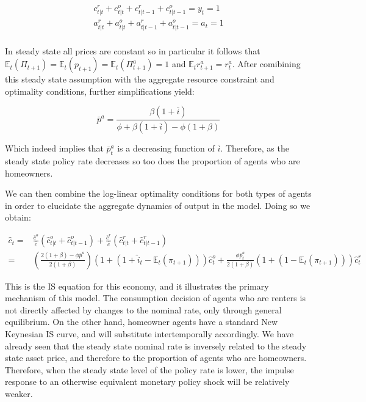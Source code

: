 \documentclass{article}
\begin{document}
\begin{align}
    c^r_{t|t} + c^o_{t|t} + c^r_{t|t-1} + c^o_{t|t-1} = y_t = 1 \\
    a^r_{t|t} + a^o_{t|t} + a^r_{t|t-1} + a^o_{t|t-1} = a_t = 1 \\
\end{align}

In steady state all prices are constant so in particular it follows that $\mathbb{E}_t(\Pi_{t+1}) = \mathbb{E}_t(p_{t+1}) = \mathbb{E}_t(\Pi^a_{t+1}) = 1$ and $\mathbb{E}_t{r^a_{t+1}} = r^a_t$. After comibining this steady state assumption with the aggregate resource constraint and optimality conditions, further simplifications yield:

\begin{equation}
    \bar{p}^a = \frac{\beta (1+\bar{i})}{\phi + \beta(1 + \bar{i}) - \phi(1+\beta)}
\end{equation}

Which indeed implies that $\bar{p}^a_t$ is a decreasing function of $\bar{i}$. Therefore, as the steady state policy rate decreases so too does the proportion of agents who are homeowners.

We can then combine the log-linear optimality conditions for both types of agents in order to elucidate the aggregate dynamics of output in the model. Doing so we obtain:

\begin{align}
    \hat{c}_t =& \frac{\bar{c}^o}{\bar{c}} \left( \hat{c}^o_{t|t} + \hat{c}^o_{t|t-1} \right) + \frac{\bar{c}^r}{\bar{c}} \left(\hat{c}^r_{t|t} + \hat{c}^r_{t|t-1} \right) \\
    =& \left( \frac{2(1+\beta) - \phi \bar{p}^a}{2(1+\beta)} \right) \left( 1 + (1 + \hat{i}_t - \mathbb{E}_t(\pi_{t+1})) \right) \hat{c}^o_t + \frac{\phi \bar{p}^a_t}{2(1+\beta)}\left( 1 + (1 - \mathbb{E}_t (\pi_{t+1})) \right) \hat{c}^r_t
\end{align}

This is the IS equation for this economy, and it illustrates the primary mechanism of this model. The consumption decision of agents who are renters is not directly affected by changes to the nominal rate, only through general equilibrium. On the other hand, homeowner agents have a standard New Keynesian IS curve, and will substitute intertemporally accordingly. We have already seen that the steady state nominal rate is inversely related to the steady state asset price, and therefore to the proportion of agents who are homeowners. Therefore, when the steady state level of the policy rate is lower,  the impulse response to an otherwise equivalent monetary policy shock will be relatively weaker.
\end{document}
